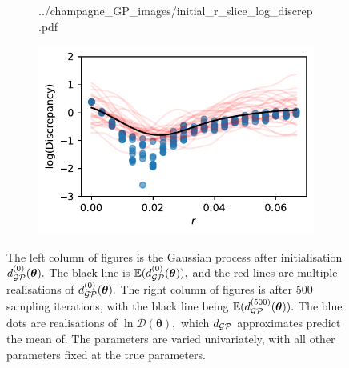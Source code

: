 \begin{figure}[htbp]
\begin{subfigure}[b]{0.5\textwidth}
{            ../champagne_GP_images/initial_r_slice_log_discrep.pdf
        }
    \end{subfigure}%
    \hfill%
    \begin{subfigure}[b]{0.5\textwidth}
        \centering
        \includegraphics[width=\textwidth]{
            ../champagne_GP_images/r_slice_500_bolfi_updates_log_discrep.pdf
        }
    \end{subfigure}
    \caption{
        The left column of figures is the Gaussian process after initialisation
        $d_{\mathcal{GP}}^{(0)}(\bm{\theta}).$ The black line is $\operatorname{\mathbb{E}}(d_{\mathcal{GP}}^{(0)}(\bm{\theta})),$
        and the red lines are multiple realisations of
        $d_{\mathcal{GP}}^{(0)}(\bm{\theta}).$ The right column of figures is after 500
        sampling iterations, with the black line being
        $\operatorname{\mathbb{E}}(d_{\mathcal{GP}}^{(500)}(\bm{\theta})).$
        The blue dots are realisations of $\ln\mathcal{D}(\bm{\theta}),$ which
        $d_{\mathcal{GP}}$ approximates predict the mean of. The parameters are varied
        univariately, with all other parameters fixed at the true parameters.
    }
    \label{fig:improving_GP}
\end{figure}

